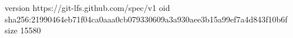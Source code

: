 version https://git-lfs.github.com/spec/v1
oid sha256:21990464eb71f04ca0aaa0cb079330609a3a930aee3b15a99ef7a4d843f10b6f
size 15580
